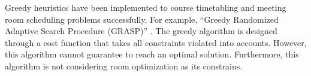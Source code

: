 Greedy heuristics have been implemented to course timetabling and meeting room scheduling problems successfully. For example, “Greedy Randomized Adaptive Search Procedure (GRASP)” \cite{moura2010grasp}. The greedy algorithm is designed through a cost function that takes all constraints violated into accounts. However, this algorithm cannot guarantee to reach an optimal solution. Furthermore, this algorithm is not considering room optimization as its constrains.
